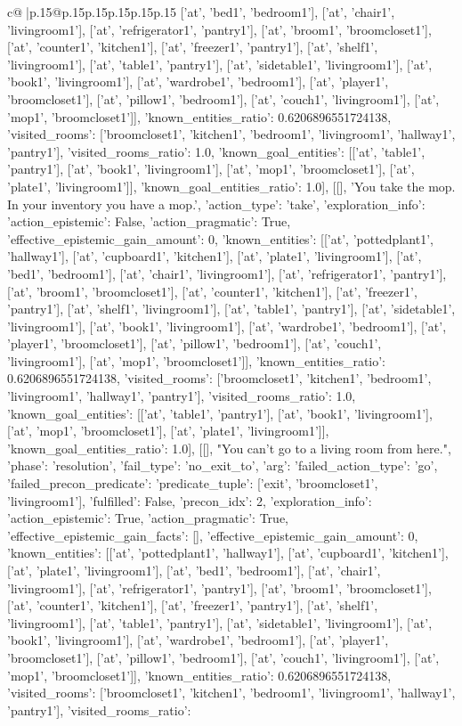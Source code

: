 \documentclass{article}
\begin{document}
{\begin{supertabular}{c@{$\;$}|p{.15\linewidth}@{}p{.15\linewidth}p{.15\linewidth}p{.15\linewidth}p{.15\linewidth}p{.15\linewidth}}
{{{['at', 'bed1', 'bedroom1'], ['at', 'chair1', 'livingroom1'], ['at', 'refrigerator1', 'pantry1'], ['at', 'broom1', 'broomcloset1'], ['at', 'counter1', 'kitchen1'], ['at', 'freezer1', 'pantry1'], ['at', 'shelf1', 'livingroom1'], ['at', 'table1', 'pantry1'], ['at', 'sidetable1', 'livingroom1'], ['at', 'book1', 'livingroom1'], ['at', 'wardrobe1', 'bedroom1'], ['at', 'player1', 'broomcloset1'], ['at', 'pillow1', 'bedroom1'], ['at', 'couch1', 'livingroom1'], ['at', 'mop1', 'broomcloset1']], 'known_entities_ratio': 0.6206896551724138, 'visited_rooms': ['broomcloset1', 'kitchen1', 'bedroom1', 'livingroom1', 'hallway1', 'pantry1'], 'visited_rooms_ratio': 1.0, 'known_goal_entities': [['at', 'table1', 'pantry1'], ['at', 'book1', 'livingroom1'], ['at', 'mop1', 'broomcloset1'], ['at', 'plate1', 'livingroom1']], 'known_goal_entities_ratio': 1.0}}], [[], 'You take the mop. In your inventory you have a mop.', {'action_type': 'take', 'exploration_info': {'action_epistemic': False, 'action_pragmatic': True, 'effective_epistemic_gain_amount': 0, 'known_entities': [['at', 'pottedplant1', 'hallway1'], ['at', 'cupboard1', 'kitchen1'], ['at', 'plate1', 'livingroom1'], ['at', 'bed1', 'bedroom1'], ['at', 'chair1', 'livingroom1'], ['at', 'refrigerator1', 'pantry1'], ['at', 'broom1', 'broomcloset1'], ['at', 'counter1', 'kitchen1'], ['at', 'freezer1', 'pantry1'], ['at', 'shelf1', 'livingroom1'], ['at', 'table1', 'pantry1'], ['at', 'sidetable1', 'livingroom1'], ['at', 'book1', 'livingroom1'], ['at', 'wardrobe1', 'bedroom1'], ['at', 'player1', 'broomcloset1'], ['at', 'pillow1', 'bedroom1'], ['at', 'couch1', 'livingroom1'], ['at', 'mop1', 'broomcloset1']], 'known_entities_ratio': 0.6206896551724138, 'visited_rooms': ['broomcloset1', 'kitchen1', 'bedroom1', 'livingroom1', 'hallway1', 'pantry1'], 'visited_rooms_ratio': 1.0, 'known_goal_entities': [['at', 'table1', 'pantry1'], ['at', 'book1', 'livingroom1'], ['at', 'mop1', 'broomcloset1'], ['at', 'plate1', 'livingroom1']], 'known_goal_entities_ratio': 1.0}}], [[], "You can't go to a living room from here.", {'phase': 'resolution', 'fail_type': 'no_exit_to', 'arg': {'failed_action_type': 'go', 'failed_precon_predicate': {'predicate_tuple': ['exit', 'broomcloset1', 'livingroom1'], 'fulfilled': False, 'precon_idx': 2}}, 'exploration_info': {'action_epistemic': True, 'action_pragmatic': True, 'effective_epistemic_gain_facts': [], 'effective_epistemic_gain_amount': 0, 'known_entities': [['at', 'pottedplant1', 'hallway1'], ['at', 'cupboard1', 'kitchen1'], ['at', 'plate1', 'livingroom1'], ['at', 'bed1', 'bedroom1'], ['at', 'chair1', 'livingroom1'], ['at', 'refrigerator1', 'pantry1'], ['at', 'broom1', 'broomcloset1'], ['at', 'counter1', 'kitchen1'], ['at', 'freezer1', 'pantry1'], ['at', 'shelf1', 'livingroom1'], ['at', 'table1', 'pantry1'], ['at', 'sidetable1', 'livingroom1'], ['at', 'book1', 'livingroom1'], ['at', 'wardrobe1', 'bedroom1'], ['at', 'player1', 'broomcloset1'], ['at', 'pillow1', 'bedroom1'], ['at', 'couch1', 'livingroom1'], ['at', 'mop1', 'broomcloset1']], 'known_entities_ratio': 0.6206896551724138, 'visited_rooms': ['broomcloset1', 'kitchen1', 'bedroom1', 'livingroom1', 'hallway1', 'pantry1'], 'visited_rooms_ratio': }}}
\end{supertabular}}
\end{document}
